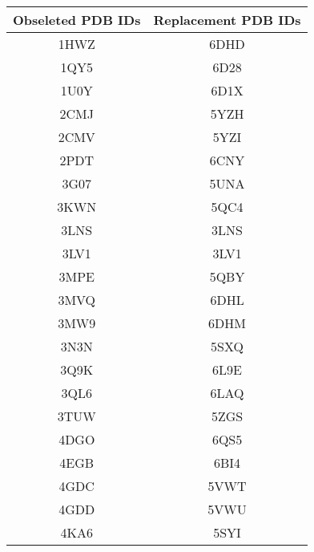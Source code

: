 \documentclass[journal=jcisd8,manuscript=article]{achemso}
\begin{document}
\begin{center}
  \begin{table}[ht]
    \centering
    \begin{tabular}{|c|c|}
      \hline
      \textbf{Obseleted PDB IDs} & \textbf{Replacement PDB IDs} \\
      \hline
      1HWZ                       & 6DHD                         \\
      1QY5                       & 6D28                         \\
      1U0Y                       & 6D1X                         \\
      2CMJ                       & 5YZH                         \\
      2CMV                       & 5YZI                         \\
      2PDT                       & 6CNY                         \\
      3G07                       & 5UNA                         \\
      3KWN                       & 5QC4                         \\
      3LNS                       & 3LNS                         \\
      3LV1                       & 3LV1                         \\
      3MPE                       & 5QBY                         \\
      3MVQ                       & 6DHL                         \\
      3MW9                       & 6DHM                         \\
      3N3N                       & 5SXQ                         \\
      3Q9K                       & 6L9E                         \\
      3QL6                       & 6LAQ                         \\
      3TUW                       & 5ZGS                         \\
      4DGO                       & 6QS5                         \\
      4EGB                       & 6BI4                         \\
      4GDC                       & 5VWT                         \\
      4GDD                       & 5VWU                         \\
      4KA6                       & 5SYI                         \\

\end{tabular}
\end{table}
\end{center}
\end{document}
